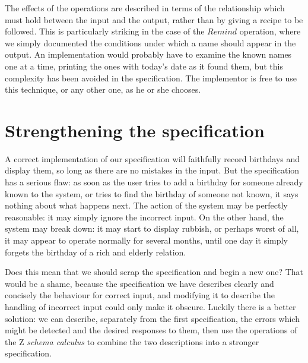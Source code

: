 The effects of the operations are described in terms of the
relationship which must hold between the input and the
output, rather than by giving a recipe to be followed. This
is particularly striking in the case of the $Remind$
operation, where we simply documented the conditions under
which a name should appear in the output. An implementation
would probably have to examine the known names one at a
time, printing the ones with today's date as it found them,
but this complexity has been avoided in the specification. The
implementor is free to use this technique, or any other one,
as he or she chooses.


\section{Strengthening the specification}

A correct implementation of our specification will faithfully record
birthdays and display them, so long as there are no mistakes in the
input. But the specification has a serious flaw: as soon as the user
tries to add a birthday for someone already known to the system, or
tries to find the birthday of someone not known, it says nothing about
what happens next. The action of the system may be perfectly
reasonable: it may simply ignore the incorrect input. On the other
hand, the system may break down: it may start to display rubbish, or
perhaps worst of all, it may appear to operate normally for several
months, until one day it simply forgets the birthday of a rich and
elderly relation.

Does this mean that we should scrap the specification and begin a new
one? That would be a shame, because the specification we have
describes clearly and concisely the behaviour for correct input, and
modifying it to describe the handling of incorrect input could only
make it obscure.  Luckily there is a better solution: we can describe,
separately from the first specification, the errors which might be
detected and the desired responses to them, then use the operations of
the Z {\em schema calculus\/} to combine the two descriptions into a
stronger specification.

